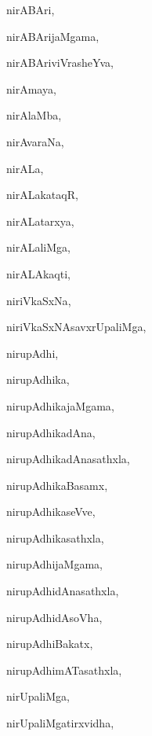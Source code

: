 \begin{multicols}{3}
{\noindent
{nirABAri}, \pageref{nirABAri}

\noindent
{nirABArijaMgama}, \pageref{nirABArijaMgama}

\noindent
{nirABAriviVrasheYva}, \pageref{nirABAriviVrasheYva}

\noindent
{nirAmaya}, \pageref{nirAmaya}

\noindent
{nirAlaMba}, \pageref{nirAlaMba}

\noindent
{nirAvaraNa}, \pageref{nirAvaraNa}

\noindent
{nirALa}, \pageref{nirALa}

\noindent
{nirALakataqR}, \pageref{nirALakataqR}

\noindent
{nirALatarxya}, \pageref{nirALatarxya}

\noindent
{nirALaliMga}, \pageref{nirALaliMga}

\noindent
{nirALAkaqti}, \pageref{nirALAkaqti}

\noindent
{niriVkaSxNa}, \pageref{niriVkaSxNa}

\noindent
{niriVkaSxNAsavxrUpaliMga}, \pageref{niriVkaSxNAsavxrUpaliMga}

\noindent
{nirupAdhi}, \pageref{nirupAdhi}

\noindent
{nirupAdhika}, \pageref{nirupAdhika}

\noindent
{nirupAdhikajaMgama}, \pageref{nirupAdhikajaMgama}

\noindent
{nirupAdhikadAna}, \pageref{nirupAdhikadAna}

\noindent
{nirupAdhikadAnasathxla}, \pageref{nirupAdhikadAnasathxla}

\noindent
{nirupAdhikaBasamx}, \pageref{nirupAdhikaBasamx}

\noindent
{nirupAdhikaseVve}, \pageref{nirupAdhikaseVve}

\noindent
{nirupAdhikasathxla}, \pageref{nirupAdhikasathxla}

\noindent
{nirupAdhijaMgama}, \pageref{nirupAdhijaMgama}

\noindent
{nirupAdhidAnasathxla}, \pageref{nirupAdhidAnasathxla}

\noindent
{nirupAdhidAsoVha}, \pageref{nirupAdhidAsoVha}

\noindent
{nirupAdhiBakatx}, \pageref{nirupAdhiBakatx}

\noindent
{nirupAdhimATasathxla}, \pageref{nirupAdhimATasathxla}

\noindent
{nirUpaliMga}, \pageref{nirUpaliMga}

\noindent
{nirUpaliMgatirxvidha}, \pageref{nirUpaliMgatirxvidha}

}
\end{multicols}
